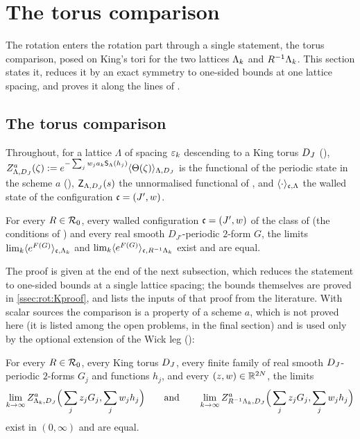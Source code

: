 \section{The torus comparison}

The rotation enters the rotation part through a single statement, the torus comparison, posed on King's tori for the two lattices $\Lambda_k$ and $R^{-1}\Lambda_k$. This section states it, reduces it by an exact symmetry to one-sided bounds at one lattice spacing, and proves it along the lines of \cite{K2}.

\subsection{The torus comparison}

Throughout, for a lattice $\Lambda$ of spacing $\varepsilon_k$ descending to a King torus $D_J$ (), $Z^a_{\Lambda,D_J}(\zeta):= e^{-\sum_jw_ja_k\mathsf S_\Lambda(h_j)}\langle\Theta(\zeta)\rangle_{\Lambda,D_J}$ is the functional of the periodic state in the scheme $a$ (), $\mathsf Z_{\Lambda,D_J}(s)$ the unnormalised functional of , and $\langle\cdot\rangle_{\mathfrak c,\Lambda}$ the walled state of the configuration $\mathfrak c=(J',w)$.

\begin{theorem}\label{rot:hyp:K}
For every $R\in\mathcal R_0$, every walled configuration $\mathfrak c=(J',w)$ of the class of  (the conditions of ) and every real smooth $D_{J'}$-periodic $2$-form $G$, the limits $\lim_k\langle e^{F(G)}\rangle_{\mathfrak c,\Lambda_k}$ and $\lim_k\langle e^{F(G)}\rangle_{\mathfrak c,R^{-1}\Lambda_k}$ exist and are equal.
\end{theorem}

The proof is given at the end of the next subsection, which reduces the statement to one-sided bounds at a single lattice spacing; the bounds themselves are proved in \cref{ssec:rot:Kproof}, and  lists the inputs of that proof from the literature. With scalar sources the comparison is a property of a scheme $a$, which is not proved here (it is listed among the open problems, in the final section) and is used only by the optional extension of the Wick leg ():

\begin{definition}\label{rot:hyp:Ka}
For every $R\in\mathcal R_0$, every King torus $D_J$, every finite family of real smooth $D_J$-periodic $2$-forms $G_j$ and functions $h_j$, and every $(z,w)\in\mathbb R^{2N}$, the limits
\[
\lim_{k\to\infty}Z^a_{\Lambda_k,D_J}\Big(\sum_jz_jG_j,\sum_jw_jh_j\Big)\qquad\text{and}\qquad
\lim_{k\to\infty}Z^a_{R^{-1}\Lambda_k,D_J}\Big(\sum_jz_jG_j,\sum_jw_jh_j\Big)
\]
exist in $(0,\infty)$ and are equal.
\end{definition}

